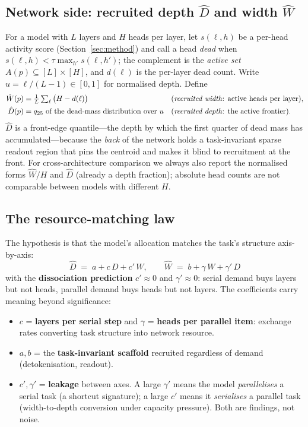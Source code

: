 \documentclass[11pt]{article}
\newcommand{\dl}{d(\ell)}
\newcommand{\Dh}{\hat{D}}
\newcommand{\Wh}{\hat{W}}
\begin{document}
\subsection{Network side: recruited depth $\Dh$ and width $\Wh$}
For a model with $L$ layers and $H$ heads per layer, let $s(\ell,h)$ be a
per-head activity score (Section~\ref{sec:method}) and call a head \emph{dead}
when $s(\ell,h) < \tau\max_{h'}s(\ell,h')$; the complement is the
\emph{active set} $A(p)\subseteq[L]\times[H]$, and $\dl$ is the per-layer dead
count. Write $u=\ell/(L{-}1)\in[0,1]$ for normalised depth. Define
\begin{align}
\Wh(p) &= \tfrac{1}{L}\textstyle\sum_{\ell}\big(H-\dl\big)
   &&\text{(\emph{recruited width}: active heads per layer)},\\
\Dh(p) &= q_{25}\ \text{of the dead-mass distribution over } u
   &&\text{(\emph{recruited depth}: the active frontier)} .
\end{align}
$\Dh$ is a front-edge quantile---the depth by which the first quarter of dead
mass has accumulated---because the \emph{back} of the network holds a
task-invariant sparse readout region that pins the centroid and makes it blind
to recruitment at the front. For cross-architecture comparison we always also
report the normalised forms $\Wh/H$ and $\Dh$ (already a depth fraction);
absolute head counts are not comparable between models with different $H$.

\subsection{The resource-matching law}
The hypothesis is that the model's allocation matches the task's structure
axis-by-axis:
\begin{equation}
\boxed{\ \Dh \;=\; a + c\,D + c'\,W, \qquad
        \Wh \;=\; b + \gamma\,W + \gamma'\,D\ }
\label{eq:law}
\end{equation}
with the \textbf{dissociation prediction} $c'\!\approx\!0$ and
$\gamma'\!\approx\!0$: serial demand buys layers but not heads, parallel demand
buys heads but not layers. The coefficients carry meaning beyond significance:

\begin{itemize}[leftmargin=1.4em,itemsep=2pt]
\item $c$ = \textbf{layers per serial step} and $\gamma$ = \textbf{heads per
parallel item}: exchange rates converting task structure into network
resource.
\item $a,b$ = the \textbf{task-invariant scaffold} recruited regardless of
demand (detokenisation, readout).
\item $c',\gamma'$ = \textbf{leakage} between axes. A large $\gamma'$ means the
model \emph{parallelises} a serial task (a shortcut signature); a large $c'$
means it \emph{serialises} a parallel task (width-to-depth conversion under
capacity pressure). Both are findings, not noise.
\end{itemize}
\end{document}
